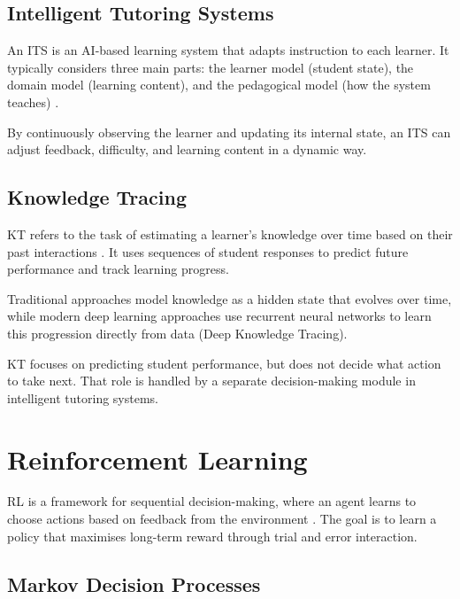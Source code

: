 \subsection{Intelligent Tutoring Systems}

An \ac{ITS} is an AI-based learning system that adapts instruction to each learner. It typically considers three main parts: the learner model (student state), the domain model (learning content), and the pedagogical model (how the system teaches) \cite{zerkouk_comprehensive_2025,kabudi_ai-enabled_2021}.

By continuously observing the learner and updating its internal state, an \ac{ITS} can adjust feedback, difficulty, and learning content in a dynamic way.


\subsection{Knowledge Tracing}\label{sec:bg:kt}

\ac{KT} refers to the task of estimating a learner’s knowledge over time based on their past interactions \cite{urbaite_adaptive_2026,kuling_ken_2025}. It uses sequences of student responses to predict future performance and track learning progress.

Traditional approaches model knowledge as a hidden state that evolves over time, while modern deep learning approaches use recurrent neural networks to learn this progression directly from data (Deep Knowledge Tracing).

\ac{KT} focuses on predicting student performance, but does not decide what action to take next. That role is handled by a separate decision-making module in intelligent tutoring systems.

\section{Reinforcement Learning}\label{sec:bg:rl}

\ac{RL} is a framework for sequential decision-making, where an agent learns to choose actions based on feedback from the environment \cite{sutton_rl_book_2018}. The goal is to learn a policy that maximises long-term reward through trial and error interaction.
\subsection{Markov Decision Processes}\label{sec:bg:mdp}


